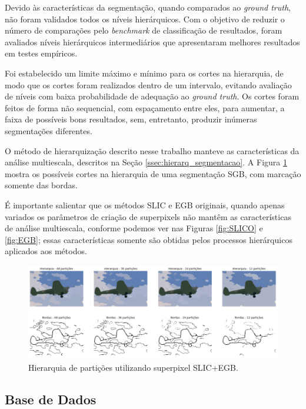 \begin{document}
Devido às características da segmentação, quando comparados ao \textit{ground truth}, não foram validados todos os níveis hierárquicos. Com o objetivo de reduzir o número de comparações pelo \textit{benchmark} de classificação de resultados, foram avaliados níveis hierárquicos intermediários que apresentaram melhores resultados em testes empíricos. 

Foi estabelecido um limite máximo e mínimo para os cortes na hierarquia, de modo que os cortes foram realizados dentro de um intervalo, evitando avaliação de níveis com baixa probabilidade de adequação ao \textit{ground truth}. Os cortes foram feitos de forma não sequencial, com espaçamento entre eles, para aumentar, a faixa de possíveis bons resultados, sem, entretanto, produzir inúmeras segmentações diferentes. 

O método de hierarquização descrito nesse trabalho manteve as características da análise multiescala, descritos na Seção \ref{ssec:hierarq_segmentacao}. A Figura \ref{fig:hierarq_partit} mostra os possíveis cortes na hierarquia de uma segmentação SGB, com marcação somente das bordas.

É importante salientar que os métodos SLIC e EGB originais, quando apenas variados os parâmetros de criação de superpixels não mantêm as características de análise multiescala, conforme podemos ver nas Figuras \ref{fig:SLICO} e \ref{fig:EGB}; essas características somente são obtidas pelos processos hierárquicos aplicados aos métodos.

\begin{figure}[ht]
\centering
\includegraphics[width=1.\textwidth]{slic_hierarquia_particoes.png}
\caption{Hierarquia de partições utilizando superpixel SLIC+EGB.}
\label{fig:hierarq_partit}
\end{figure}


\subsection{Base de Dados} \label{ssec:base_dados}
\end{document}
